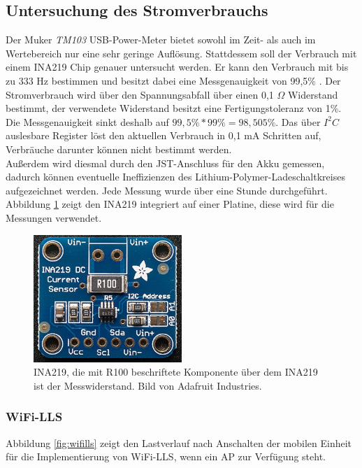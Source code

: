 \subsection{Untersuchung des Stromverbrauchs}
\label{ch:phase1:sec:energie}
Der Muker \emph{TM103} USB-Power-Meter bietet sowohl im Zeit- als auch im Wertebereich nur eine sehr geringe Auflösung.
Stattdessem soll der Verbrauch mit einem INA219 Chip genauer untersucht werden.
Er kann den Verbrauch mit bis zu 333 Hz bestimmen und besitzt dabei eine Messgenauigkeit von 99,5\% \cite{texas2015ina}.
Der Stromverbrauch wird über den Spannungsabfall über einen 0,1 $\Omega$ Widerstand bestimmt, der verwendete Widerstand besitzt eine Fertigungstoleranz von 1\%.
Die Messgenauigkeit sinkt deshalb auf $99,5\% * 99\% = 98,505\%$. 
Das über $I^2C$ auslesbare Register löst den aktuellen Verbrauch in 0,1 mA Schritten auf, Verbräuche darunter können nicht bestimmt werden.\\
Außerdem wird diesmal durch den JST-Anschluss für den Akku gemessen, dadurch können eventuelle Ineffizienzen des Lithium-Polymer-Ladeschaltkreises aufgezeichnet werden. 
Jede Messung wurde über eine Stunde durchgeführt.
Abbildung \ref{fig:ina219} zeigt den INA219 integriert auf einer Platine, diese wird für die Messungen verwendet.

\begin{figure}[h!]
  \centering
	\includegraphics[width=0.5\textwidth]{images/ina219ada.png}
  \caption{INA219, die mit R100 beschriftete Komponente über dem INA219 ist der Messwiderstand. Bild von Adafruit Industries\protect \footnotemark.}
  \label{fig:ina219}
\end{figure}

\subsubsection{WiFi-LLS}
\label{ch:phase1:sec:powerwifills}
Abbildung \ref{fig:wifills} zeigt den Lastverlauf nach Anschalten der mobilen Einheit für die Implementierung von WiFi-LLS, wenn ein AP zur Verfügung steht. 

